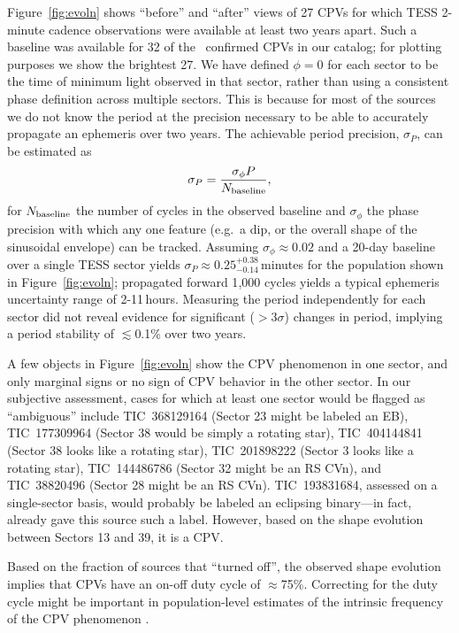 \documentclass[11pt,twocolumn,tighten,linenumbers]{aastex63}
\begin{document}
Figure~\ref{fig:evoln} shows ``before'' and ``after'' views of 27 CPVs
for which TESS 2-minute cadence observations were available at least
two years apart.  Such a baseline was available for 32 of the \ngoods\
confirmed CPVs in our catalog; for plotting purposes we show the
brightest 27.  We have defined $\phi=0$ for each sector to be the time
of minimum light observed in that sector, rather than using a
consistent phase definition across multiple sectors.  This is because
for most of the sources we do not know the period at the precision
necessary to be able to accurately propagate an ephemeris over two
years.  The achievable period precision, $\sigma_P$, can be estimated
as
\begin{equation}
  \sigma_{P} = \frac { \sigma_{\phi} P } { N_{\rm baseline} },
  \label{eq:periodprecision}
\end{equation}
for $N_{\rm baseline}$ the number of cycles in the observed baseline
and $\sigma_{\phi}$ the phase precision with which any one feature
(e.g.~a dip, or the overall shape of the sinusoidal envelope) can be
tracked.  Assuming $\sigma_\phi$$\approx$$0.02$ and a 20-day baseline
over a single TESS sector yields
$\sigma_{P}$$\approx$$0.25^{+0.38}_{-0.14}$\,minutes for the
population shown in Figure~\ref{fig:evoln}; propagated forward 1{,}000
cycles yields a typical ephemeris uncertainty range of 2-11\,hours.
Measuring the period independently for each sector did not reveal
evidence for significant ($>$3$\sigma$) changes in period, implying a
period stability of $\lesssim$0.1\% over two years.

A few objects in Figure~\ref{fig:evoln} show the CPV phenomenon in one
sector, and only marginal signs or no sign of CPV behavior in the
other sector.  In our subjective assessment, cases for which at least
one sector would be flagged as ``ambiguous'' include
TIC~368129164 (Sector 23 might be labeled an EB),
TIC~177309964 (Sector 38 would be simply a rotating star),
TIC~404144841 (Sector 38 looks like a rotating star),
TIC~201898222 (Sector 3 looks like a rotating star),
TIC~144486786 (Sector 32 might be an RS CVn),
and
TIC~38820496 (Sector 28 might be an RS CVn).
TIC~193831684, assessed on a single-sector basis, would probably be
labeled an eclipsing binary---in fact, \citet{2021ApJ...912..123J}
already gave this source such a label.  However, based on the shape
evolution between Sectors 13 and 39, it is a CPV.

Based on the fraction of sources that ``turned off'', the
observed shape evolution implies that CPVs have an on-off duty cycle
of $\approx$75\%.  Correcting for the duty cycle might be important in
population-level estimates of the intrinsic frequency of the CPV
phenomenon \citep[e.g.][]{2022AJ....163..144G}.
\end{document}
